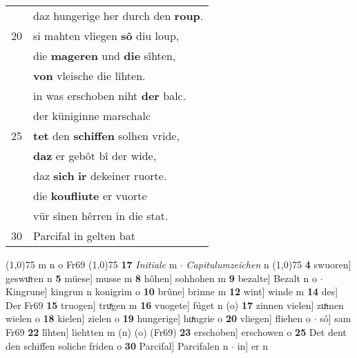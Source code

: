 \documentclass[8pt,a4paper,notitlepage]{article}
\begin{document}
\begin{table}[ht]
\begin{minipage}[t]{0.5\linewidth}
\begin{tabular}{rl}
 & daz hungerige her durch den \textbf{roup}.\\ 
20 & si mahten vliegen \textbf{sô} diu loup,\\ 
 & die \textbf{mageren} und \textbf{die} sîhten,\\ 
 & \textbf{von} vleische die lîhten.\\ 
 & in was erschoben niht \textbf{der} balc.\\ 
 & der küniginne marschalc\\ 
25 & \textbf{tet} den \textbf{schiffen} solhen vride,\\ 
 & \textbf{daz} er gebôt bî der wide,\\ 
 & daz \textbf{sich} \textbf{ir} dekeiner ruorte.\\ 
 & die \textbf{koufliute} er vuorte\\ 
 & vür sînen hêrren in die stat.\\ 
30 & Parcifal in gelten bat\\ 
\end{tabular}
\scriptsize
\line(1,0){75} \newline
m n o Fr69 \newline
\line(1,0){75} \newline
\textbf{17} \textit{Initiale} m   $\cdot$ \textit{Capitulumzeichen} n  \newline
\line(1,0){75} \newline
\textbf{4} swuoren] geswuͦren n \textbf{5} müese] musse m \textbf{8} hôhen] sohhohen m \textbf{9} bezalte] Bezalt n o  $\cdot$ Kingrune] kingrun n konigrim o \textbf{10} brûne] brinne m \textbf{12} wint] winde m \textbf{14} des] Der Fr69 \textbf{15} truogen] truͯgen m \textbf{16} vuogete] fúget n (o) \textbf{17} zinnen vielen] zuͯmen wielen o \textbf{18} kielen] zielen o \textbf{19} hungerige] huͯngrie o \textbf{20} vliegen] fliehen o  $\cdot$ sô] sam Fr69 \textbf{22} lîhten] liehtten m (n) (o) (Fr69) \textbf{23} erschoben] erschowen o \textbf{25} Det dent den schiffen soliche friden o \textbf{30} Parcifal] Parcifalen n  $\cdot$ in] er n \newline
\end{minipage}
\end{table}
\newpage
\end{document}
